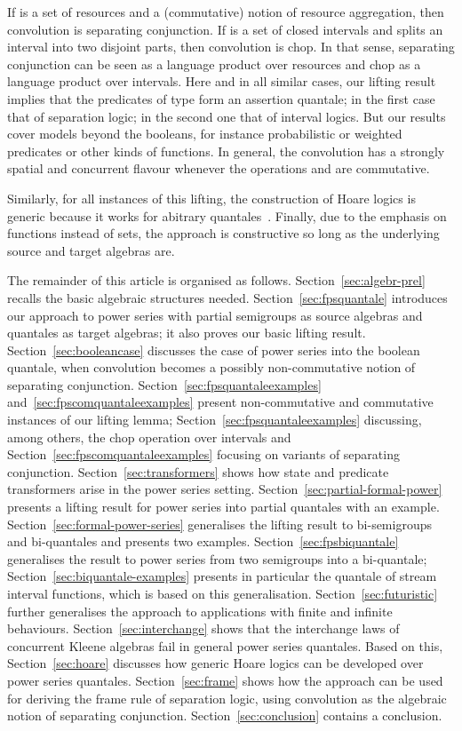 \documentclass[12pt]{article}
\theoremstyle{definition}
\begin{document}
If  is a set of resources and  a (commutative) notion of
resource aggregation, then convolution is separating conjunction. If
 is a set of closed intervals and  splits an interval into
two disjoint parts, then convolution is chop. In that sense,
separating conjunction can be seen as a language product over
resources and chop as a language product over intervals. Here and in
all similar cases, our lifting result implies that the predicates of
type  form an assertion quantale; in the first case
that of separation logic; in the second one that of interval
logics. But our results cover models beyond the booleans, for instance
probabilistic or weighted predicates or other kinds of functions. In
general, the convolution has a strongly spatial and concurrent flavour
whenever the operations  and  are commutative.

Similarly, for all instances of this lifting, the construction of
Hoare logics is generic because it works for abitrary
quantales~\cite{HMSW11}. Finally, due to the emphasis on functions
instead of sets, the approach is constructive so long as the
underlying source and target algebras are.

The remainder of this article is organised as
follows. Section~\ref{sec:algebr-prel} recalls the basic algebraic
structures needed. Section~\ref{sec:fpsquantale} introduces our
approach to power series with partial semigroups as source algebras
and quantales as target algebras; it also proves our basic lifting
result. Section~\ref{sec:booleancase} discusses the case of power
series into the boolean quantale, when convolution becomes a possibly
non-commutative notion of separating
conjunction. Section~\ref{sec:fpsquantaleexamples}
and~\ref{sec:fpscomquantaleexamples} present non-commutative and
commutative instances of our lifting lemma;
Section~\ref{sec:fpsquantaleexamples} discussing, among others, the
chop operation over intervals and
Section~\ref{sec:fpscomquantaleexamples} focusing on variants of
separating conjunction. Section~\ref{sec:transformers} shows how state
and predicate transformers arise in the power series setting.
Section~\ref{sec:partial-formal-power} presents a lifting result for
power series into partial quantales with an
example. Section~\ref{sec:formal-power-series} generalises the lifting
result to bi-semigroups and bi-quantales and presents two
examples. Section~\ref{sec:fpsbiquantale} generalises the result to
power series from two semigroups into a bi-quantale;
Section~\ref{sec:biquantale-examples} presents in particular the
quantale of stream interval functions, which is based on this
generalisation.  Section~\ref{sec:futuristic} further generalises the
approach to applications with finite and infinite
behaviours. Section~\ref{sec:interchange} shows that the interchange
laws of concurrent Kleene algebras fail in general power series
quantales. Based on this, Section~\ref{sec:hoare} discusses how
generic Hoare logics can be developed over power series
quantales. Section~\ref{sec:frame} shows how the approach can be used
for deriving the frame rule of separation logic, using convolution as
the algebraic notion of separating
conjunction. Section~\ref{sec:conclusion} contains a conclusion.
\end{document}
